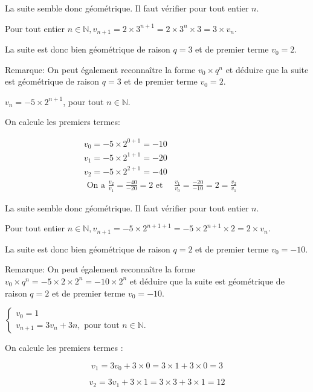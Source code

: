 \documentclass[11pt,a4paper]{article}  %
\begin{document}
\begin{enumMet}
\begin{corrBox}
		
		La suite semble donc géométrique. Il faut vérifier pour tout entier $n$.
		
		Pour tout entier $n \in \mathbb{N}, v_{n+1}=2 \times 3^{n+1}=2 \times 3^n \times 3=3 \times v_n$.
		
		La suite est donc bien géométrique de raison $q=3$ et de premier terme $v_0=2$.
		
		Remarque: On peut également reconnaître la forme $v_0 \times q^n$ et déduire que la suite est géométrique de raison $q=3$ et de premier terme $v_0=2$.	
	\end{corrBox}
	\item $v_n=-5 \times 2^{n+1}$, pour tout $n \in \mathbb{N}$.
	\begin{corrBox}
		On calcule les premiers termes:
		
		$$
		\begin{aligned}
			& v_0=-5 \times 2^{0+1}=-10 \\
			& v_1=-5 \times 2^{1+1}=-20 \\
			& v_2=-5 \times 2^{2+1}=-40 \\
			& \text { On a } \frac{v_2}{v_1}=\frac{-40}{-20}=2 \text { et }\quad \frac{v_1}{v_0}=\frac{-20}{-10}=2=\frac{v_2}{v_1}
		\end{aligned}
		$$
		
		
		La suite semble donc géométrique. Il faut vérifier pour tout entier $n$.
		
		Pour tout entier $n \in \mathbb{N}, v_{n+1}=-5 \times 2^{n+1+1}=-5 \times 2^{n+1} \times 2=2 \times v_n$.
		
		La suite est donc bien géométrique de raison $q=2$ et de premier terme $v_0=-10$.
		
		Remarque: On peut également reconnaître la forme $v_0 \times q^n=-5 \times 2 \times 2^n=-10 \times 2^n$ et déduire que la suite est géométrique de raison $q=2$ et de premier terme $v_0=-10$.		
	\end{corrBox}
	\item $\left\{\begin{array}{l}v_0=1 \\ v_{n+1}=3 v_n+3 n, \text { pour tout } n \in \mathbb{N} .\end{array}\right.$
	\begin{corrBox}
		On calcule les premiers termes :
		
		$$
		v_1=3 v_0+3 \times 0=3 \times 1+3 \times 0=3
		$$
		
		
		$$
		v_2=3 v_1+3 \times 1=3 \times 3+3 \times 1=12
		$$
		

\end{corrBox}
\end{enumMet}
\end{document}
